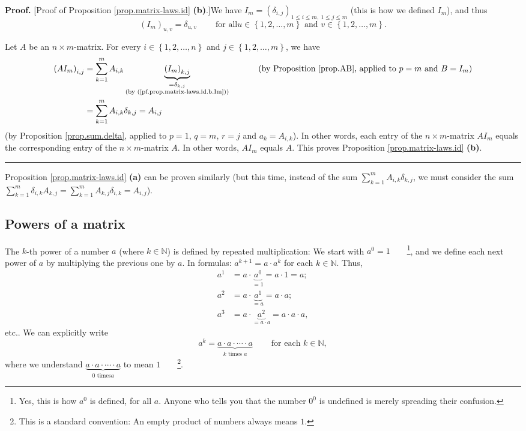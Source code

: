 \documentclass[numbers=enddot,12pt,final,onecolumn,notitlepage]{scrartcl}%
\theoremstyle{definition}
\newenvironment{proof}[1][Proof]{\noindent\textbf{#1.} }{\ \rule{0.5em}{0.5em}}
\let\sumnonlimits\sum
\renewcommand{\sum}{\sumnonlimits\limits}
\begin{document}
\begin{proof}
[Proof of Proposition \ref{prop.matrix-laws.id} \textbf{(b)}.]We have
$I_{m}=\left(  \delta_{i,j}\right)  _{1\leq i\leq m,\ 1\leq j\leq m}$ (this is
how we defined $I_{m}$), and thus%
\begin{equation}
\left(  I_{m}\right)  _{u,v}=\delta_{u,v}\ \ \ \ \ \ \ \ \ \ \text{for all
}u\in\left\{  1,2,\ldots,m\right\}  \text{ and }v\in\left\{  1,2,\ldots
,m\right\}  . \label{pf.prop.matrix-laws.id.b.Im}%
\end{equation}


Let $A$ be an $n\times m$-matrix. For every $i\in\left\{  1,2,\ldots
,n\right\}  $ and $j\in\left\{  1,2,\ldots,m\right\}  $, we have%
\begin{align*}
\left(  AI_{m}\right)  _{i,j}  &  =\sum_{k=1}^{m}A_{i,k}\underbrace{\left(
I_{m}\right)  _{k,j}}_{\substack{=\delta_{k,j}\\\text{(by
(\ref{pf.prop.matrix-laws.id.b.Im}))}}}\ \ \ \ \ \ \ \ \ \ \left(  \text{by
Proposition \ref{prop.AB}, applied to }p=m\text{ and }B=I_{m}\right) \\
&  =\sum_{k=1}^{m}A_{i,k}\delta_{k,j}=A_{i,j}%
\end{align*}
(by Proposition \ref{prop.sum.delta}, applied to $p=1$, $q=m$, $r=j$ and
$a_{k}=A_{i,k}$). In other words, each entry of the $n\times m$-matrix
$AI_{m}$ equals the corresponding entry of the $n\times m$-matrix $A$. In
other words, $AI_{m}$ equals $A$. This proves Proposition
\ref{prop.matrix-laws.id} \textbf{(b)}.
\end{proof}

Proposition \ref{prop.matrix-laws.id} \textbf{(a)} can be proven similarly
(but this time, instead of the sum $\sum_{k=1}^{m}A_{i,k}\delta_{k,j}$, we
must consider the sum $\sum_{k=1}^{m}\delta_{i,k}A_{k,j}=\sum_{k=1}^{m}%
A_{k,j}\delta_{i,k}=A_{i,j}$).

\subsection{Powers of a matrix}

The $k$-th power of a number $a$ (where $k\in\mathbb{N}$) is defined by
repeated multiplication: We start with $a^{0}=1$\ \ \ \ \footnote{Yes, this is
how $a^{0}$ is defined, for all $a$. Anyone who tells you that the number
$0^{0}$ is undefined is merely spreading their confusion.}, and we define each
next power of $a$ by multiplying the previous one by $a$. In formulas:
$a^{k+1}=a\cdot a^{k}$ for each $k\in\mathbb{N}$. Thus,%
\begin{align*}
a^{1}  &  =a\cdot\underbrace{a^{0}}_{=1}=a\cdot1=a;\\
a^{2}  &  =a\cdot\underbrace{a^{1}}_{=a}=a\cdot a;\\
a^{3}  &  =a\cdot\underbrace{a^{2}}_{=a\cdot a}=a\cdot a\cdot a,
\end{align*}
etc.. We can explicitly write
\[
a^{k}=\underbrace{a\cdot a\cdot\cdots\cdot a}_{k\text{ times }a}%
\ \ \ \ \ \ \ \ \ \ \text{for each }k\in\mathbb{N},
\]
where we understand $\underbrace{a\cdot a\cdot\cdots\cdot a}_{0\text{ times
}a}$ to mean $1$\ \ \ \ \footnote{This is a standard convention: An empty
product of numbers always means $1$.}.
\end{document}
